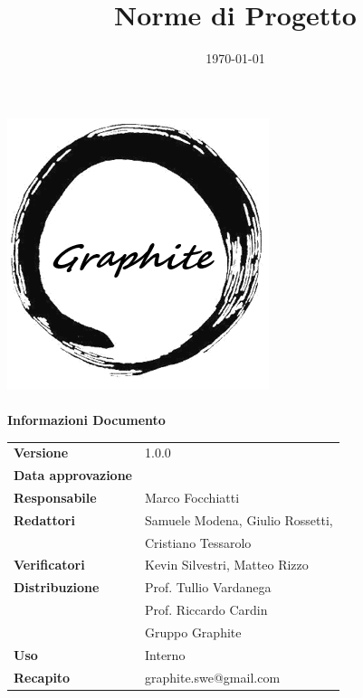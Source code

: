 \documentclass[openany,12pt,a4paper]{report}
\title{Norme di Progetto}
\author{}
\date{\today}
\begin{document}
	\makeatletter
	\begin{titlepage}
		\setlength{\headsep}{0pt}  
		\begin{center}			
			\includegraphics[width=0.5\linewidth]{logo.png}\\[1em]
			{\huge \bfseries  \@title }\\[10ex]
			\textbf{\Large Informazioni Documento} \\[2em]
			\bgroup
			\def\arraystretch{1.5}
			\begin{tabular}{l|l}
				\textbf{Versione} & 1.0.0 \\
				\textbf{Data approvazione} & \large \@date \\
				\textbf{Responsabile} & Marco Focchiatti \\
				\textbf{Redattori} & Samuele Modena, Giulio Rossetti,\\ 
				& Cristiano Tessarolo \\
				\textbf{Verificatori} & Kevin Silvestri, Matteo Rizzo \\
				\textbf{Distribuzione} & Prof. Tullio Vardanega \\
				 & Prof. Riccardo Cardin \\
				 & Gruppo Graphite \\
				\textbf{Uso} & Interno \\
				\textbf{Recapito} & graphite.swe@gmail.com \\
			\end{tabular}
		\egroup
		\end{center}
	\end{titlepage}
	\makeatother

	\thispagestyle{empty}
	\newpage
			
	
	
	\tableofcontents
	
	
	
	
	
	
	
	
	
\end{document}
